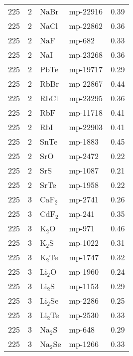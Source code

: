 \begin{table*}[t]
\begin{center}
\begin{tabular}{rrllr}
         225 &            2 &         NaBr &   mp-22916 &       0.39 \\
         225 &            2 &         NaCl &   mp-22862 &       0.36 \\
         225 &            2 &          NaF &     mp-682 &       0.33 \\
         225 &            2 &          NaI &   mp-23268 &       0.36 \\
         225 &            2 &         PbTe &   mp-19717 &       0.29 \\
         225 &            2 &         RbBr &   mp-22867 &       0.44 \\
         225 &            2 &         RbCl &   mp-23295 &       0.36 \\
         225 &            2 &          RbF &   mp-11718 &       0.41 \\
         225 &            2 &          RbI &   mp-22903 &       0.41 \\
         225 &            2 &         SnTe &    mp-1883 &       0.45 \\
         225 &            2 &          SrO &    mp-2472 &       0.22 \\
         225 &            2 &          SrS &    mp-1087 &       0.21 \\
         225 &            2 &         SrTe &    mp-1958 &       0.22 \\
         225 &            3 &      CaF$_2$ &    mp-2741 &       0.26 \\
         225 &            3 &      CdF$_2$ &     mp-241 &       0.35 \\
         225 &            3 &       K$_2$O &     mp-971 &       0.46 \\
         225 &            3 &       K$_2$S &    mp-1022 &       0.31 \\
         225 &            3 &      K$_2$Te &    mp-1747 &       0.32 \\
         225 &            3 &      Li$_2$O &    mp-1960 &       0.24 \\
         225 &            3 &      Li$_2$S &    mp-1153 &       0.29 \\
         225 &            3 &     Li$_2$Se &    mp-2286 &       0.25 \\
         225 &            3 &     Li$_2$Te &    mp-2530 &       0.33 \\
         225 &            3 &      Na$_2$S &     mp-648 &       0.29 \\
         225 &            3 &     Na$_2$Se &    mp-1266 &       0.33 \\

\end{tabular}
\end{center}
\end{table*}
